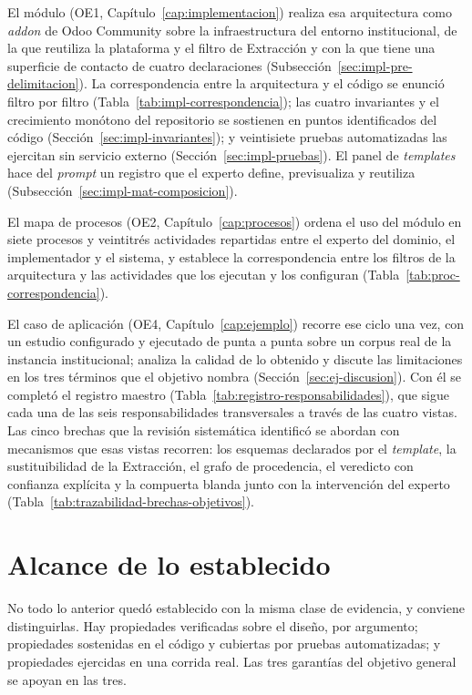 \documentclass[12pt]{report}
\begin{document}
El módulo (OE1, Capítulo~\ref{cap:implementacion}) realiza esa arquitectura como \textit{addon} de Odoo Community sobre la infraestructura del entorno institucional, de la que reutiliza la plataforma y el filtro de Extracción y con la que tiene una superficie de contacto de cuatro declaraciones (Subsección~\ref{sec:impl-pre-delimitacion}). La correspondencia entre la arquitectura y el código se enunció filtro por filtro (Tabla~\ref{tab:impl-correspondencia}); las cuatro invariantes y el crecimiento monótono del repositorio se sostienen en puntos identificados del código (Sección~\ref{sec:impl-invariantes}); y veintisiete pruebas automatizadas las ejercitan sin servicio externo (Sección~\ref{sec:impl-pruebas}). El panel de \textit{templates} hace del \textit{prompt} un registro que el experto define, previsualiza y reutiliza (Subsección~\ref{sec:impl-mat-composicion}).

El mapa de procesos (OE2, Capítulo~\ref{cap:procesos}) ordena el uso del módulo en siete procesos y veintitrés actividades repartidas entre el experto del dominio, el implementador y el sistema, y establece la correspondencia entre los filtros de la arquitectura y las actividades que los ejecutan y los configuran (Tabla~\ref{tab:proc-correspondencia}).

El caso de aplicación (OE4, Capítulo~\ref{cap:ejemplo}) recorre ese ciclo una vez, con un estudio configurado y ejecutado de punta a punta sobre un corpus real de la instancia institucional; analiza la calidad de lo obtenido y discute las limitaciones en los tres términos que el objetivo nombra (Sección~\ref{sec:ej-discusion}). Con él se completó el registro maestro (Tabla~\ref{tab:registro-responsabilidades}), que sigue cada una de las seis responsabilidades transversales a través de las cuatro vistas. Las cinco brechas que la revisión sistemática identificó se abordan con mecanismos que esas vistas recorren: los esquemas declarados por el \textit{template}, la sustituibilidad de la Extracción, el grafo de procedencia, el veredicto con confianza explícita y la compuerta blanda junto con la intervención del experto (Tabla~\ref{tab:trazabilidad-brechas-objetivos}).

\section{Alcance de lo establecido}
\label{sec:conc-alcance}

No todo lo anterior quedó establecido con la misma clase de evidencia, y conviene distinguirlas. Hay propiedades verificadas sobre el diseño, por argumento; propiedades sostenidas en el código y cubiertas por pruebas automatizadas; y propiedades ejercidas en una corrida real. Las tres garantías del objetivo general se apoyan en las tres.
\end{document}
